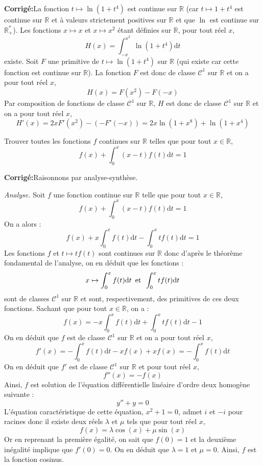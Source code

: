 \documentclass[a4paper,twoside,french,11pt]{VcCours}
\newcommand{\dt}{\text{d}t}
\newcommand{\corr}{\textbf{Corrigé:}}
\begin{document}
\corr La fonction $t \mapsto \ln(1+t^4)$ est continue sur $\mathbb{R}$ (car $t \mapsto 1+t^4$ est continue sur $\mathbb{R}$ et à valeurs strictement positives sur $\mathbb{R}$ et que $\ln$ est continue sur $\mathbb{R}_+^{*}$). Les fonctions $x \mapsto x$ et $x \mapsto x^2$ étant définies sur $\mathbb{R}$, pour tout réel $x$,
$$ H(x) = \int_{-x}^{x^2} \ln(1+t^4) \dt$$
existe. Soit $F$ une primitive de $t \mapsto \ln(1+t^4)$ sur $\mathbb{R}$ (qui existe car cette fonction est continue sur $\mathbb{R}$). La fonction $F$ est donc de classe $\mathcal{C}^1$ sur $\mathbb{R}$ et on a pour tout réel $x$,
$$ H(x) = F(x^2)-F(-x)$$
Par composition de fonctions de classe $\mathcal{C}^1$ sur $\mathbb{R}$, $H$ est donc de classe $\mathcal{C}^1$ sur $\mathbb{R}$ et on a pour tout réel $x$,
$$ H'(x) = 2x F'(x^2)-(-F'(-x)) = 2x \ln(1+x^8)+ \ln(1+x^4)$$


\begin{Exercice}{} Trouver toutes les fonctions $f$ continues sur $\mathbb{R}$ telles que pour tout $x \in \mathbb{R}$,
$$ f(x) + \int_{0}^x (x-t)f(t) \dt =1$$
\end{Exercice} 

\corr Raisonnons par analyse-synthèse.


\noindent \textit{Analyse.} Soit $f$ une fonction continue sur $\mathbb{R}$ telle que pour tout $x \in \mathbb{R}$,
$$ f(x) + \int_{0}^x (x-t)f(t) \dt =1$$
On a alors :
$$ f(x) + x \int_0^x f(t) \dt - \int_0^x t f(t) \dt = 1$$
Les fonctions $f$ et $t \mapsto t f(t)$ sont continues sur $\mathbb{R}$ donc d'après le théorème fondamental de l'analyse, on en déduit que les fonctions :
$$x \mapsto \int_0^x f(t) \dt \, \hbox{ et } \, \int_0^x tf(t) \dt$$ 
sont de classes $\mathcal{C}^1$ sur $\mathbb{R}$ et sont, respectivement, des primitives de ces deux fonctions. Sachant que pour tout $x \in \mathbb{R}$, on a :
$$ f(x) =  -x \int_0^x f(t) \dt + \int_0^x t f(t) \dt - 1$$
On en déduit que $f$ est de classe $\mathcal{C}^1$ sur $\mathbb{R}$ et on a pour tout réel $x$,
$$ f'(x) = - \int_0^x f(t) \dt - xf(x) + xf(x) = - \int_0^x f(t) \dt$$
On en déduit que $f'$ est de classe $\mathcal{C}^1$ sur $\mathbb{R}$ et pour tout réel $x$,
$$ f''(x) = -f(x)$$
Ainsi, $f$ est solution de l'équation différentielle linéaire d'ordre deux homogène suivante :
$$ y''+y=0$$
L'équation caractéristique de cette équation, $x^2+1=0$, admet $i$ et $-i$ pour racines donc il existe deux réels $\lambda$ et $\mu$ tels que pour tout réel $x$,
$$ f(x) = \lambda \cos(x) + \mu \sin(x)$$
Or en reprenant la première égalité, on sait que $f(0)=1$ et la deuxième inégalité implique que $f'(0)=0$. On en déduit que $\lambda=1$ et $\mu=0$. Ainsi, $f$ est la fonction cosinus.
\end{document}
